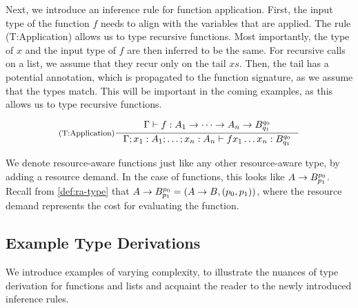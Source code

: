 Next, we introduce an inference rule for function application. First, the input type of the function \(f\) needs to align with the variables that are applied. The rule (T:Application) allows us to type recursive functions. Most importantly, the type of \(x\) and the input type of \(f\) are then inferred to be the same. For recursive calls on a list, we assume that they recur only on the tail \(xs\). Then, the tail has a potential annotation, which is propagated to the function signature, as we assume that the types match. This will be important in the coming examples, as this allows us to type recursive functions.

\[
   \inference[(T:Application)]
   {\typing{\Gamma}{f}{A_1 \to \dots \to A_n \to \ratype{B}{q_0}{q_1}}}
   {\typing{\Gamma;x_1:A_1;\dots;x_n:A_n}{f x_1 \dots x_n}{\ratype{B}{q_0}{q_1}}}
\]

\begin{remark}
   We denote resource-aware functions just like any other resource-aware type, by adding a resource demand. In the case of functions, this looks like \(A \to B ^{p_0}_{p_1}\). Recall from \cref{def:ra-type} that \(A \to B ^{p_0}_{p_1} = (A \to B, (p_0, p_1))\), where the resource demand represents the cost for evaluating the function.
\end{remark}

\subsection{Example Type Derivations}\label{sec:example-type-derivations}

We introduce examples of varying complexity, to illustrate the nuances of type derivation for functions and lists and acquaint the reader to the newly introduced inference rules.

